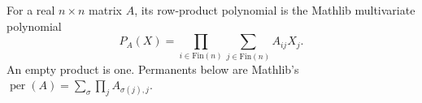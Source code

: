 \begin{definition}
For a real $n\times n$ matrix $A$, its row-product polynomial is the
Mathlib multivariate polynomial
\[
 P_A(X)=\prod_{i\in\mathrm{Fin}(n)}\sum_{j\in\mathrm{Fin}(n)} A_{ij}X_j.
\]
An empty product is one. Permanents below are Mathlib's
$\operatorname{per}(A)=\sum_\sigma\prod_j A_{\sigma(j),j}$.
\end{definition}

